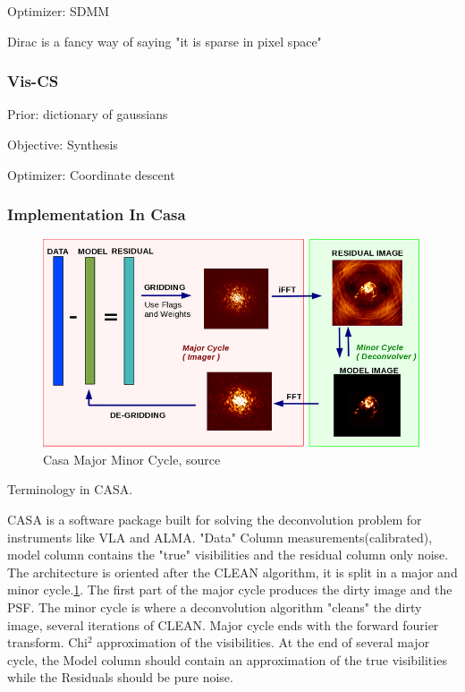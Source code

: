 Optimizer: SDMM

Dirac is a fancy way of saying "it is sparse in pixel space"


\subsubsection{Vis-CS}
Prior: dictionary of gaussians

Objective: Synthesis

Optimizer: Coordinate descent

\pagebreak
\subsubsection{Implementation In Casa}

\begin{figure}
	\centering
	\vspace{-15pt}
	\includegraphics[width=0.9\linewidth]{./chapters/04.cs/img/casa_major_minor.png}
	\caption{Casa Major Minor Cycle, source \cite{casa2018major}}
	\label{cs:major}
	\vspace{-10pt}
\end{figure}

Terminology in CASA.

CASA is a software package built for solving the deconvolution problem for instruments like VLA and ALMA. "Data" Column measurements(calibrated), model column contains the "true" visibilities and the residual column only noise. The architecture is oriented after the CLEAN algorithm, it is split in a major and minor cycle.\ref{cs:major}. The first part of the major cycle produces the dirty image and the PSF. The minor cycle is where a deconvolution algorithm "cleans" the dirty image, several iterations of CLEAN. Major cycle ends with the forward fourier transform. Chi$^2$ approximation of the visibilities. At the end of several major cycle, the Model column should contain an approximation of the true visibilities while the Residuals should be pure noise.

